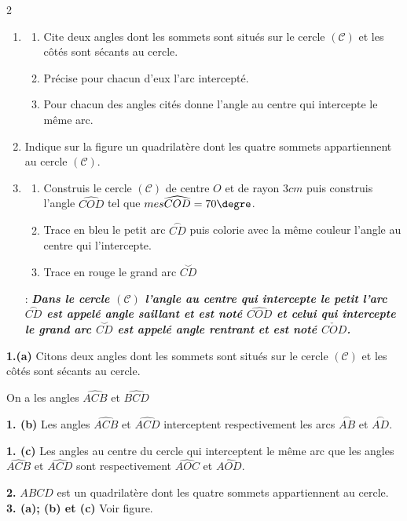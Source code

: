 \begin{multicols*}{2}
  	\begin{enumerate}
  		\item 	\begin{enumerate}
  			\item Cite deux angles dont les sommets sont situés sur le cercle $\mathcal{(C)}$ et les côtés sont sécants au cercle.
  			\item Précise pour chacun d'eux l'arc intercepté.
  			\item  Pour chacun des angles cités donne l'angle au centre qui intercepte le même arc.
  		\end{enumerate}
  		\item  Indique sur la figure un quadrilatère dont les quatre sommets appartiennent au cercle  $\mathcal{(C)}$.
  		\item 	\begin{enumerate}
  			\item  Construis le cercle $\mathcal{(C)}$ de centre $O$ et de rayon $3cm$ puis construis l'angle $\widehat{COD}$ tel que $mes\widehat{COD}=70\textmd{\degre}$.
  			\item  Trace en bleu le petit arc $\overset{\frown}{CD}$ puis colorie avec la même couleur l'angle au centre qui l'intercepte.
  			\item Trace en rouge le grand arc  $\overset{\smile}{CD}$
  		\end{enumerate}
  		: \textit{\textbf{ Dans le cercle $\mathcal{(C)}$ l'angle au centre qui intercepte le petit l'arc $\overset{\frown}{CD}$ est appelé angle saillant et est noté  $\widehat{COD}$ et celui qui intercepte le grand arc  $\overset{\smile}{CD}$ est appelé angle rentrant et est noté  $\check{COD}$.}}
  	\end{enumerate}
  	\dure 
  	\resul
  	\textbf{1.(a)}  Citons deux angles dont les sommets sont situés sur le cercle $\mathcal{(C)}$ et les côtés sont sécants au cercle.
  	
  	On a les angles $\widehat{ACB}$ et $\widehat{BCD}$
  	
  	\textbf{1. (b)} Les angles $\widehat{ACB}$ et $\widehat{ACD}$ interceptent respectivement les arcs $\overset{\frown}{AB}$ et $\overset{\frown}{AD}$.
  	
  	\textbf{1. (c)} Les angles au centre du cercle qui interceptent le même arc que les angles $\widehat{ACB}$ et $\widehat{ACD}$ sont respectivement $\widehat{AOC}$ et $\widehat{AOD}$.
  	
  	\textbf{2.} $ABCD$ est un quadrilatère dont les quatre sommets appartiennent au cercle.\\
  	\textbf{3. (a); (b) et (c)}  Voir figure.
  	

\end{multicols*}
